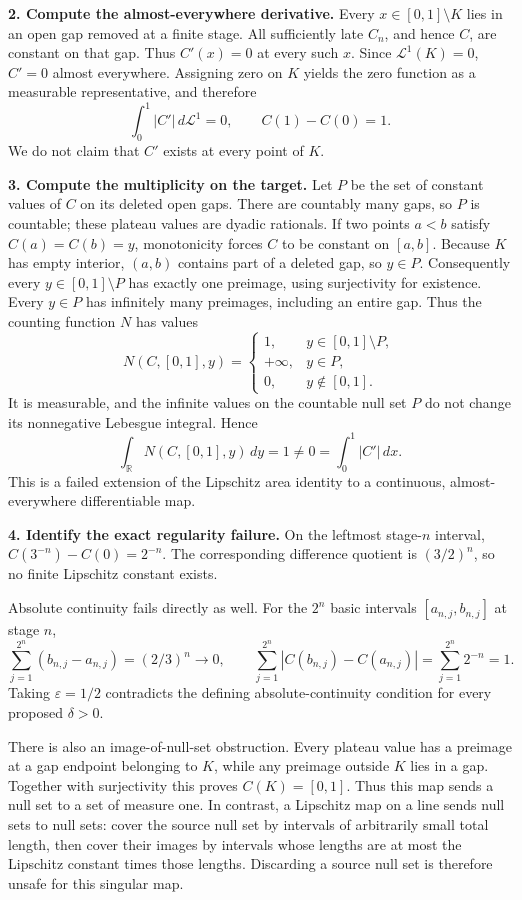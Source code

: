 \documentclass[
  11pt,
]{article}
\begin{document}
\textbf{2. Compute the almost-everywhere derivative.} Every
\(x\in[0,1]\setminus K\) lies in an open gap removed at a finite stage.
All sufficiently late \(C_n\), and hence \(C\), are constant on that
gap. Thus \(C'(x)=0\) at every such \(x\). Since \(\mathcal L^1(K)=0\),
\(C'=0\) almost everywhere. Assigning zero on \(K\) yields the zero
function as a measurable representative, and therefore \[
\int_0^1|C'|\,d\mathcal L^1=0,
\qquad C(1)-C(0)=1.
\] We do not claim that \(C'\) exists at every point of \(K\).

\textbf{3. Compute the multiplicity on the target.} Let \(P\) be the set
of constant values of \(C\) on its deleted open gaps. There are
countably many gaps, so \(P\) is countable; these plateau values are
dyadic rationals. If two points \(a<b\) satisfy \(C(a)=C(b)=y\),
monotonicity forces \(C\) to be constant on \([a,b]\). Because \(K\) has
empty interior, \((a,b)\) contains part of a deleted gap, so \(y\in P\).
Consequently every \(y\in[0,1]\setminus P\) has exactly one preimage,
using surjectivity for existence. Every \(y\in P\) has infinitely many
preimages, including an entire gap. Thus the counting function \(N\) has
values \[
N(C,[0,1],y)=
\begin{cases}
1,&y\in[0,1]\setminus P,\\
+\infty,&y\in P,\\
0,&y\notin[0,1].
\end{cases}
\] It is measurable, and the infinite values on the countable null set
\(P\) do not change its nonnegative Lebesgue integral. Hence \[
\int_{\mathbb R}N(C,[0,1],y)\,dy=1\ne0=\int_0^1|C'|\,dx.
\] This is a failed extension of the Lipschitz area identity to a
continuous, almost-everywhere differentiable map.

\textbf{4. Identify the exact regularity failure.} On the leftmost
stage-\(n\) interval, \(C(3^{-n})-C(0)=2^{-n}\). The corresponding
difference quotient is \((3/2)^n\), so no finite Lipschitz constant
exists.

Absolute continuity fails directly as well. For the \(2^n\) basic
intervals \([a_{n,j},b_{n,j}]\) at stage \(n\), \[
\sum_{j=1}^{2^n}(b_{n,j}-a_{n,j})=(2/3)^n\longrightarrow0,
\qquad
\sum_{j=1}^{2^n}|C(b_{n,j})-C(a_{n,j})|
=\sum_{j=1}^{2^n}2^{-n}=1.
\] Taking \(\varepsilon=1/2\) contradicts the defining
absolute-continuity condition for every proposed \(\delta>0\).

There is also an image-of-null-set obstruction. Every plateau value has
a preimage at a gap endpoint belonging to \(K\), while any preimage
outside \(K\) lies in a gap. Together with surjectivity this proves
\(C(K)=[0,1]\). Thus this map sends a null set to a set of measure one.
In contrast, a Lipschitz map on a line sends null sets to null sets:
cover the source null set by intervals of arbitrarily small total
length, then cover their images by intervals whose lengths are at most
the Lipschitz constant times those lengths. Discarding a source null set
is therefore unsafe for this singular map.
\end{document}
